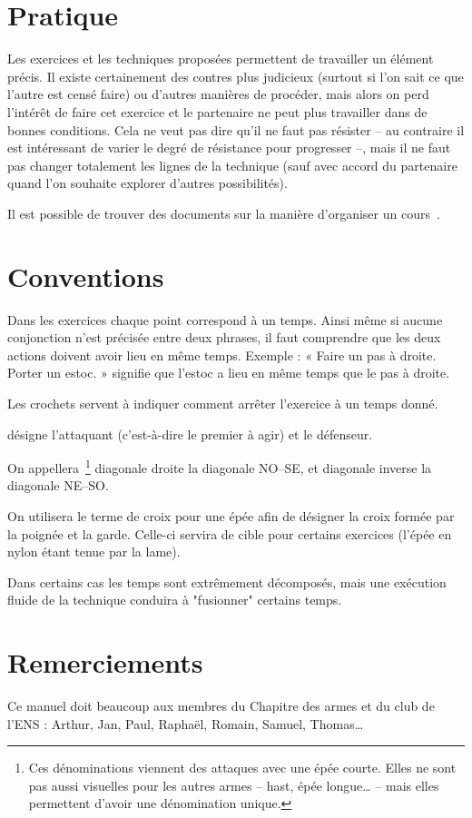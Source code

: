 \section{Pratique}


Les exercices et les techniques proposées permettent de travailler un élément précis.
Il existe certainement des contres plus judicieux (surtout si l'on sait ce que l'autre est censé faire) ou d'autres manières de procéder, mais alors on perd l'intérêt de faire cet exercice et le partenaire ne peut plus travailler dans de bonnes conditions.
Cela ne veut pas dire qu'il ne faut pas résister – au contraire il est intéressant de varier le degré de résistance pour progresser –, mais il ne faut pas changer totalement les lignes de la technique (sauf avec accord du partenaire quand l'on souhaite explorer d'autres possibilités).

Il est possible de trouver des documents sur la manière d'organiser un cours~\cite{linnard:how_we_train}.


\section{Conventions}


Dans les exercices chaque point correspond à un temps. Ainsi même si aucune conjonction n'est précisée entre deux phrases, il faut comprendre que les deux actions doivent avoir lieu en même temps. Exemple : « Faire un pas à droite. Porter un estoc. » signifie que l'estoc a lieu en même temps que le pas à droite.

Les crochets servent à indiquer comment arrêter l'exercice à un temps donné.

\A désigne l'attaquant (c'est-à-dire le premier à agir) et \D le défenseur.

On appellera~\footnote{Ces dénominations viennent des attaques avec une épée courte. Elles ne sont pas aussi visuelles pour les autres armes – hast, épée longue… – mais elles permettent d'avoir une dénomination unique.} diagonale droite la diagonale NO–SE, et diagonale inverse la diagonale NE–SO.

On utilisera le terme de croix pour une épée afin de désigner la croix formée par la poignée et la garde.
Celle-ci servira de cible pour certains exercices (l'épée en nylon étant tenue par la lame).

Dans certains cas les temps sont extrêmement décomposés, mais une exécution fluide de la technique conduira à "fusionner" certains temps.


\section{Remerciements}


Ce manuel doit beaucoup aux membres du Chapitre des armes et du club de l'ENS : Arthur, Jan, Paul, Raphaël, Romain, Samuel, Thomas…
